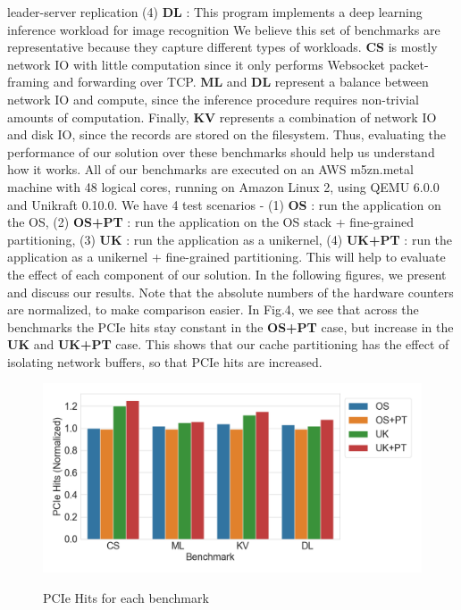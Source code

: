 \documentclass[sigconf,authorversion,noacm]{acmart}
\begin{document}
leader-server replication (4) \textbf{DL} : This program implements a deep
learning inference workload for image recognition
We believe this set of benchmarks are representative because they capture
different types of workloads. \textbf{CS} is mostly network IO with little
computation since it only performs Websocket packet-framing and forwarding over
TCP. \textbf{ML} and \textbf{DL} represent a balance between network IO and
compute, since the inference procedure requires non-trivial amounts of
computation. Finally, \textbf{KV} represents a combination of network IO and
disk IO, since the records are stored on the filesystem. Thus, evaluating the
performance of our solution over these benchmarks should help us understand how
it works. All of our benchmarks are executed on an AWS m5zn.metal machine with
48 logical cores, running on Amazon Linux 2, using QEMU 6.0.0 and Unikraft
0.10.0. We have 4 test scenarios - (1) \textbf{OS} : run the application on the
OS, (2) \textbf{OS+PT} : run the application on the OS stack + fine-grained
partitioning, (3) \textbf{UK} : run the application as a unikernel, (4)
\textbf{UK+PT} : run the application as a unikernel + fine-grained partitioning.
This will help to evaluate the effect of each component of our solution. In the
following figures, we present and discuss our results. Note that the absolute
numbers of the hardware counters are normalized, to make comparison easier. In
Fig.4, we see that across the benchmarks the PCIe hits stay constant in the
\textbf{OS+PT} case, but increase in the \textbf{UK} and \textbf{UK+PT} case.
This shows that our cache partitioning has the effect of isolating network
buffers, so that PCIe hits are increased.

\begin{figure}[h]
  \centering
  \includegraphics[width=\linewidth]{res1}
    \label{fig:motivating}
    \vspace{-2em}
    \caption{PCIe Hits for each benchmark}
\end{figure}
\end{document}
